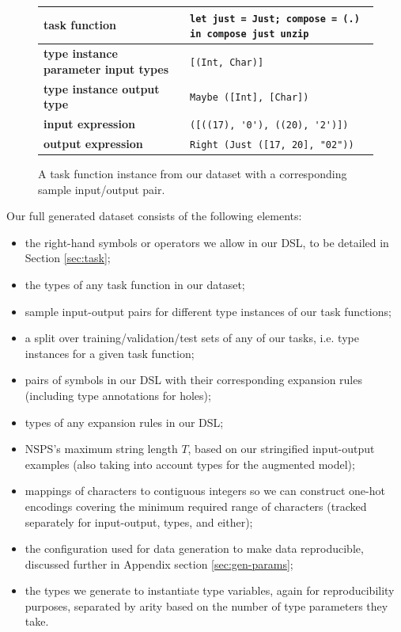 \documentclass{article} %
\begin{document}
\begin{figure}
    \begin{tabular}{|l|l|} \hline
        \textbf{task function} & \verb|let just = Just; compose = (.) in compose just unzip| \\ \hline
        \textbf{type instance parameter input types} & \verb|[(Int, Char)]| \\ \hline
        \textbf{type instance output type} & \verb|Maybe ([Int], [Char])| \\ \hline
        \textbf{input expression} & \verb|([((17), '0'), ((20), '2')])| \\ \hline
        \textbf{output expression} & \verb|Right (Just ([17, 20], "02"))| \\ \hline
    \end{tabular}
    \caption{A task function instance from our dataset with a corresponding sample input/output pair.}
    \label{fig:datasample}
\end{figure}

Our full generated dataset consists of the following elements:
\begin{itemize}
    \item the right-hand symbols or operators we allow in our DSL, to be detailed in Section \ref{sec:task};
    \item the types of any task function in our dataset;
    \item sample input-output pairs for different type instances of our task functions;
    \item a split over training/validation/test sets of any of our tasks, i.e. type instances for a given task function;
    \item pairs of symbols in our DSL with their corresponding expansion rules (including type annotations for holes);
    \item types of any expansion rules in our DSL; %
    \item NSPS's maximum string length $T$, based on our stringified input-output examples (also taking into account types for the augmented model);
    \item mappings of characters to contiguous integers so we can construct one-hot encodings covering the minimum required range of characters (tracked separately for input-output, types, and either);
    \item the configuration used for data generation to make data reproducible, discussed further in Appendix section \ref{sec:gen-params};
    \item the types we generate to instantiate type variables, again for reproducibility purposes, separated by arity based on the number of type parameters they take.
\end{itemize}
\end{document}
